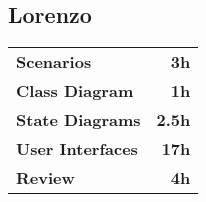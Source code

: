\subsection*{Lorenzo}
\begin{table}[H]
    \begin{tabular}{lr}
        \toprule
        \textbf{Scenarios}                     & \textbf{3h} \\
        \textbf{Class Diagram}                 & \textbf{1h}   \\
        \textbf{State Diagrams}                & \textbf{2.5h} \\
        \textbf{User Interfaces}               & \textbf{17h}   \\
        \textbf{Review}                        & \textbf{4h}   \\
        \bottomrule
    \end{tabular}
\end{table}
